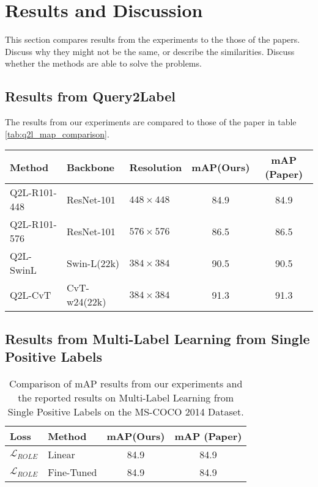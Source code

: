 \documentclass[lettersize,journal]{IEEEtran}
\begin{document}

\section{Results and Discussion}

This section compares results from the experiments to the those of the papers. Discuss why they might not be the same, or describe the similarities. Discuss whether the methods are able to solve the problems.


\subsection{Results from Query2Label}
The results from our experiments are compared to those of the paper in table \ref{tab:q2l_map_comparison}. 

\begin{table*}[!t]
    \small
    \caption{Comparison of mAP results from our experiments and the reported results on Query2Label on the MS-COCO 2014 Dataset.}
    \label{tab:q2l_map_comparison}
    \centering
    \begin{tabular}{l l l c c}
    \toprule
    \textbf{Method} & \textbf{Backbone} & \textbf{Resolution} & \textbf{mAP(Ours)} & \textbf{mAP (Paper)} \\
    \midrule
    Q2L-R101-448 & ResNet-101     & $448\times448$ & 84.9 & 84.9 \\
    Q2L-R101-576 & ResNet-101     & $576\times576$ & 86.5 & 86.5 \\
    Q2L-SwinL    & Swin-L(22k)    & $384\times384$ & 90.5 & 90.5 \\
    Q2L-CvT      & CvT-w24(22k)   & $384\times384$ & 91.3 & 91.3 \\
    \bottomrule
    \end{tabular}
\end{table*}


\subsection{Results from Multi-Label Learning from Single Positive Labels}

\begin{table}[!t]
    \small
    \caption{Comparison of mAP results from our experiments and the reported results on Multi-Label Learning from Single Positive Labels on the MS-COCO 2014 Dataset.}
    \label{tab:MLSPL_map_comparison}
    \centering
    \begin{tabular}{l l c c}
    \toprule
    \textbf{Loss} & \textbf{Method} & \textbf{mAP(Ours)} & \textbf{mAP (Paper)} \\
    \midrule
    $\mathcal{L}_{ROLE}$ & Linear & 84.9 & 84.9 \\
    $\mathcal{L}_{ROLE}$ & Fine-Tuned & 84.9 & 84.9 \\
    \bottomrule
    \end{tabular}
\end{table}
\end{document}
